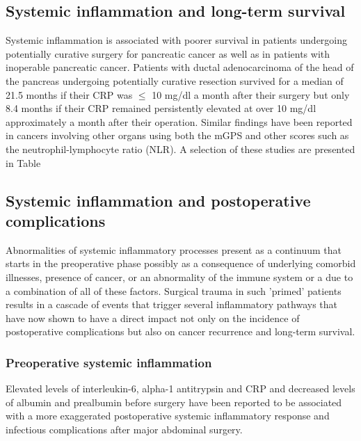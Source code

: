 \subsection{Systemic inflammation and long-term survival}
Systemic inflammation is associated with poorer survival in patients undergoing potentially curative surgery for pancreatic cancer \parencite{jamieson_systemic_2005,clark_preoperative_2007,bhatti_preoperative_2010} as well as in patients with inoperable pancreatic cancer.\parencite{glen_evaluation_2006} Patients with ductal adenocarcinoma of the head of the pancreas undergoing potentially curative resection survived for a median of 21.5 months if their CRP was $\leq$ 10 mg/dl a month after their surgery but only 8.4 months if their CRP remained persistently elevated at over 10 mg/dl approximately a month after their operation.\parencite{jamieson_systemic_2005} Similar findings have been reported in cancers involving other organs using both the mGPS and other scores such as the neutrophil-lymphocyte ratio (NLR). A selection of these studies are presented in Table %

\subsection{Systemic inflammation and postoperative complications}

Abnormalities of systemic inflammatory processes present as a continuum that starts in the preoperative phase possibly as a consequence of underlying comorbid illnesses, presence of cancer, or an abnormality of the immune system or a due to a combination of all of these factors. Surgical trauma in such 'primed' patients results in a cascade of events that trigger several inflammatory pathways that have now shown to have a direct impact not only on the incidence of postoperative complications but also on cancer recurrence and long-term survival.

\subsubsection{Preoperative systemic inflammation}
Elevated levels of interleukin-6, alpha-1 antitrypsin and CRP and decreased levels of albumin and prealbumin before surgery have been reported to be associated with a more exaggerated postoperative systemic inflammatory response and infectious complications after major abdominal surgery.\parencite{haupt_association_1997}

